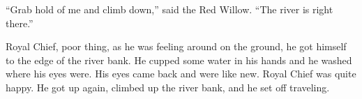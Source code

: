 ``Grab hold of me and climb down,'' said the Red Willow. ``The river is right there.''

Royal Chief, poor thing, as he was feeling around on the ground, he got himself to the edge of the river bank. He cupped some water in his hands and he washed where his eyes were. His eyes came back and were like new. Royal Chief was quite happy. He got up again, climbed up the river bank, and he set off traveling.






